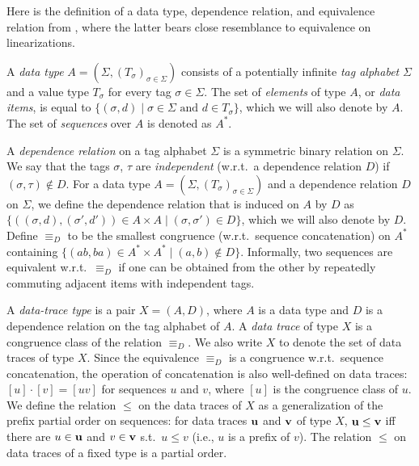 Here is the definition of a data type, dependence relation, and equivalence relation from , where the latter bears close resemblance to equivalence on linearizations.

\begin{definition}
A \emph{data type} $A = (\Sigma,(T_\sigma)_{\sigma \in \Sigma})$ consists of a potentially infinite \emph{tag alphabet} $\Sigma$ and a value type $T_\sigma$ for every tag $\sigma \in \Sigma$. The set of \emph{elements} of type $A$, or \emph{data items}, is equal to $\{ (\sigma,d) \mid \text{$\sigma \in \Sigma$ and $d \in T_\sigma$} \}$, which we will also denote by $A$. The set of \emph{sequences} over $A$ is denoted as $A^*$.

A \emph{dependence relation} on a tag alphabet $\Sigma$ is a symmetric binary relation on $\Sigma$. We say that the tags $\sigma$, $\tau$ are \emph{independent} (w.r.t.\ a dependence relation $D$) if $(\sigma,\tau) \notin D$. For a data type $A = (\Sigma,(T_\sigma)_{\sigma \in \Sigma})$ and a dependence relation $D$ on $\Sigma$, we define the dependence relation that is induced on $A$ by $D$ as
$\{
   ((\sigma,d),(\sigma',d')) \in A \times A \mid
   (\sigma,\sigma') \in D
 \}
$,
which we will also denote by $D$. Define $\equiv_D$ to be the smallest congruence (w.r.t.\ sequence concatenation) on $A^*$ containing $\{ (ab,ba) \in A^* \times A^* \mid (a,b) \notin D \}$. Informally, two sequences are equivalent w.r.t.\ $\equiv_D$ if one can be obtained from the other by repeatedly commuting adjacent items with independent tags.
\end{definition}

\begin{definition}
A \emph{data-trace type} is a pair $X = (A,D)$, where $A$ is a data type and $D$ is a dependence relation on the tag alphabet of $A$. A \emph{data trace} of type $X$ is a congruence class of the relation $\equiv_D$. We also write $X$ to denote the set of data traces of type $X$. Since the equivalence $\equiv_D$ is a congruence w.r.t.\ sequence concatenation, the operation of concatenation is also well-defined on data traces: $[u] \cdot [v] = [uv]$ for sequences $u$ and $v$, where $[u]$ is the congruence class of $u$. We define the relation $\leq$ on the data traces of $X$ as a generalization of the prefix partial order on sequences:
for data traces $\mathbf{u}$ and $\mathbf{v}$ of type $X$, $\mathbf{u} \leq \mathbf{v}$ iff there are $u \in \mathbf{u}$ and $v \in \mathbf{v}$ s.t.\ $u \leq v$ (i.e., $u$ is a prefix of $v$). The relation $\leq$ on data traces of a fixed type is a partial order.
\end{definition}

